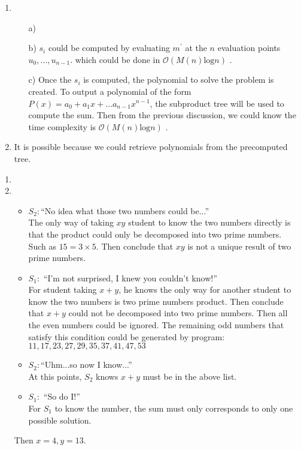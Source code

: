\documentclass{assignment}
\begin{document}
\begin{homeworkProblem}
\begin{enumerate}
\item 
\begin{enumerate}
\item[a)]
\item[b)] $s_i$ could be computed by evaluating $m^{'}$ at the $n$ evaluation points $u_0,\dots, u_{n-1}$. which could be done in $\mathcal{O}(M(n)\text{log}n)$ .
\item[c)] Once the $s_i$ is computed, the polynomial to solve the problem is created. To output a polynomial of the form $P(x)=a_0+a_1x+\dots a_{n-1}x^{n-1}$, the subproduct tree will be used to compute the sum. Then from the previous discussion, we could know the time complexity is $\mathcal{O}(M(n)\text{log}n)$ .
\end{enumerate}
\item It is possible because we could retrieve polynomials from the precomputed tree. 
\end{enumerate}
    
    
    \end{homeworkProblem}

\newpage
    
    \begin{homeworkProblem}

\begin{enumerate}
\item
\item 
\begin{itemize}
\item \textbf{$S_2:$}``No idea what those two numbers could be...” \\
The only way of taking $xy$ student to know the two numbers directly is that the product could only be decomposed into two prime numbers. Such as $15=3\times 5$. Then conclude that $xy$ is not a unique result of two prime numbers. 
\item \textbf{$S_1:$}  ``I’m not surprised, I knew you couldn’t know!” \\
For student taking $x+y$, he knows the only way for another student to know the two numbers  is two prime numbers product. Then conclude that $x+y$ could not be decomposed into two prime numbers. Then all the even numbers could be ignored. The remaining odd numbers that satisfy this condition could be generated by program: $11, 17, 23, 27, 29, 35, 37, 41, 47, 53$
\item \textbf{$S_2:$}``Uhm...so now I know...” \\
At this points, $S_2$ knows $x+y$ must be in the above list. 
\item \textbf{$S_1:$}  ``So do I!” \\
For $S_1$ to know the number, the sum must only corresponds to only one possible solution. 
\end{itemize}
Then $x=4, y=13$.
\end{enumerate}
    
    \end{homeworkProblem}
    
\end{document}
